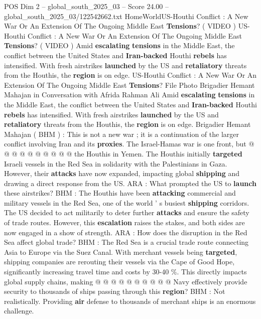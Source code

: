 \begin{textsample}{POS Dim 2 – global\_south\_2025\_03 – Score 24.00 – global\_south\_2025\_03/122542662.txt}  \label{ex:f2_pos_281}
HomeWorldUS-Houthi Conflict : A New War Or An Extension Of The Ongoing Middle East \textbf{Tensions}? ( VIDEO ) US-Houthi Conflict : A New War Or An Extension Of The Ongoing Middle East \textbf{Tensions}? ( VIDEO ) Amid \textbf{escalating} \textbf{tensions} in the Middle East, the conflict between the United States and \textbf{Iran-backed} Houthi \textbf{rebels} has intensified.
With fresh airstrikes \textbf{launched} by the US and \textbf{retaliatory} threats from the Houthis, the \textbf{region} is on edge.
US-Houthi Conflict : A New War Or An Extension Of The Ongoing Middle East \textbf{Tensions}?
File Photo Brigadier Hemant Mahajan in Conversation with Afrida Rahman Ali Amid \textbf{escalating} \textbf{tensions} in the Middle East, the conflict between the United States and \textbf{Iran-backed} Houthi \textbf{rebels} has intensified.
With fresh airstrikes \textbf{launched} by the US and \textbf{retaliatory} threats from the Houthis, the \textbf{region} is on edge.
Brigadier Hemant Mahajan ( BHM ) : This is not a new war ; it is a continuation of the larger conflict involving Iran and its \textbf{proxies}.
The Israel-Hamas war is one front, but @ @ @ @ @ @ @ @ @ @ the Houthis in Yemen.
The Houthis initially \textbf{targeted} Israeli vessels in the Red Sea in solidarity with the Palestinians in Gaza.
However, their \textbf{attacks} have now expanded, impacting global \textbf{shipping} and drawing a direct response from the US.
ARA : What prompted the US to \textbf{launch} these airstrikes?
BHM : The Houthis have been \textbf{attacking} commercial and military vessels in the Red Sea, one of the world ' s busiest \textbf{shipping} corridors.
The US decided to act militarily to deter further \textbf{attacks} and ensure the safety of trade routes.
However, this \textbf{escalation} raises the stakes, and both sides are now engaged in a show of strength.
ARA : How does the disruption in the Red Sea affect global trade?
BHM : The Red Sea is a crucial trade route connecting Asia to Europe via the Suez Canal.
With merchant vessels being \textbf{targeted}, shipping companies are rerouting their vessels via the Cape of Good Hope, significantly increasing travel time and costs by 30-40 \%.
This directly impacts global supply chains, making @ @ @ @ @ @ @ @ @ @ Navy effectively provide security to thousands of ships passing through this \textbf{region}?
BHM : Not realistically.
Providing \textbf{air} defense to thousands of merchant ships is an enormous challenge.

\end{textsample}
